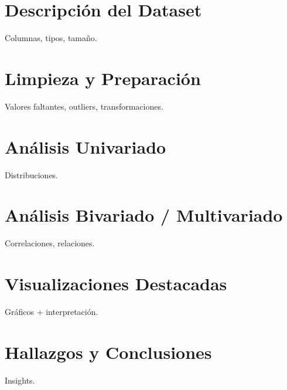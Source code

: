 \graphicspath{{./}}\GenerarPortada
\section{Descripción del Dataset} Columnas, tipos, tamaño.
\section{Limpieza y Preparación} Valores faltantes, outliers, transformaciones.
\section{Análisis Univariado} Distribuciones.
\section{Análisis Bivariado / Multivariado} Correlaciones, relaciones.
\section{Visualizaciones Destacadas} Gráficos + interpretación.
\section{Hallazgos y Conclusiones} Insights.


